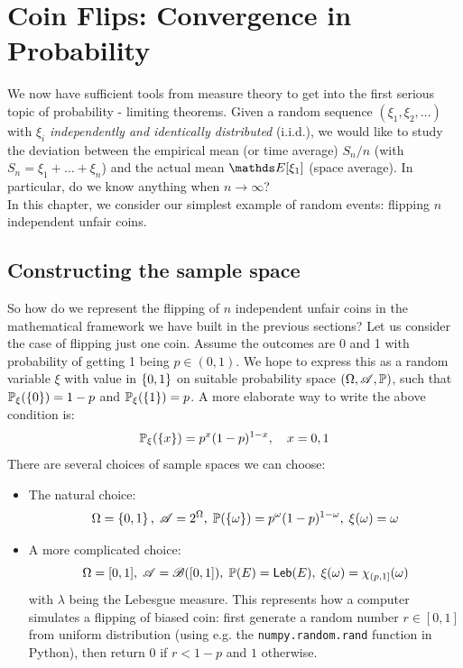 \section{Coin Flips: Convergence in Probability}
We now have sufficient tools from measure theory to get into the first serious topic of probability - limiting theorems. Given a random sequence $(\xi_1, \xi_2, \dots)$ with $\xi_i$ \textit{independently and identically distributed} (i.i.d.), we would like to study the deviation between the empirical mean (or time average) $S_n/n$ (with $S_n = \xi_1 + \dots + \xi_n$) and the actual mean $\E[\xi_1]$ (space average). In particular, do we know anything when $n \to \infty$?\\

In this chapter, we consider our simplest example of random events: flipping $n$ independent unfair coins.

\subsection{Constructing the sample space}
So how do we represent the flipping of $n$ independent unfair coins in the mathematical framework we have built in the previous sections? Let us consider the case of flipping just one coin. Assume the outcomes are 0 and 1 with probability of getting 1 being $p \in (0,1)$. We hope to express this as a random variable $\xi$ with value in $\left\{ 0,1 \right \}$ on suitable probability space $(\Omega, \mathcal{A}, \mathbb{P})$, such that $\mathbb{P}_\xi(\left\{ 0 \right \}) = 1-p$ and $\mathbb{P}_\xi(\left\{ 1 \right \}) = p$. A more elaborate way to write the above condition is: 
\begin{equation} \label{eq:Bernoulli_pmf}
    \mathbb{P}_\xi(\left\{ x \right \}) = p^x (1-p)^{1-x}, \quad x = 0,1
\end{equation}
There are several choices of sample spaces we can choose: \\

\begin{itemize}
    \item The natural choice: 
    $$\Omega = \left\{ 0,1 \right \}, \; \mathcal{A} = 2^\Omega, \; \mathbb{P}(\left\{ \omega \right \}) = p^\omega (1-p)^{1-\omega}, \; \xi(\omega) = \omega$$
    \item A more complicated choice: 
    $$\Omega = [0,1], \; \mathcal{A} = \mathcal{B}([0,1]), \; \mathbb{P}(E) = \mathsf{Leb}(E), \; \xi(\omega) = \chi_{(p,1]}(\omega)$$
    with $\lambda$ being the Lebesgue measure. This represents how a computer simulates a flipping of biased coin: first generate a random number $r \in [0,1]$ from uniform distribution (using e.g. the \verb|numpy.random.rand| function in Python), then return $0$ if $r < 1-p$ and $1$ otherwise. 
\end{itemize}

